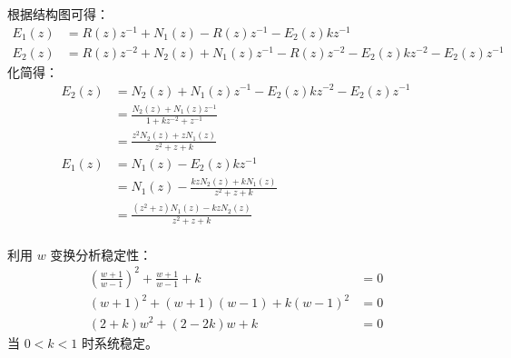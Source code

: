 {{	根据结构图可得：
	\begin{align*}
		E_1(z) &=R(z)z^{-1}+N_1(z) -R(z)z^{-1}-E_2(z)kz^{-1} \\
		E_2(z )&=R(z)z^{-2}+N_2(z)+N_1(z)z^{-1} -R(z)z^{-2}-E_2(z)kz^{-2}-E_2(z)z^{-1} 
	\end{align*}
	化简得：
	\begin{align*}
	E_2(z )&=N_2(z)+N_1(z)z^{-1}-E_2(z)kz^{-2}-E_2(z)z^{-1}\\
	       &=\frac{N_2(z)+N_1(z)z^{-1}}{1+kz^{-2}+z^{-1}}\\
	       &=\frac{z^2 N_2(z)+z N_1(z)}{z^2+z+k}\\
	E_1(z) &=N_1(z)-E_2(z)kz^{-1} \\
	       &=N_1(z)-\frac{kz N_2(z)+k N_1(z)}{z^2+z+k}\\
	       &=\frac{(z^2+z)N_1(z)-kz N_2(z)}{z^2+z+k}\\
	\end{align*}
	
	利用 $w$ 变换分析稳定性：
		\begin{align*}
		\left(\frac{w+1}{w-1}\right)^2+\frac{w+1}{w-1}+k &=0 \\
		(w+1)^2+(w+1)(w-1)+k(w-1)^2 &=0   \\
		(2+k)w^2+(2-2k)w+k &=0
		\end{align*}
		当 $0<k<1$ 时系统稳定。
		
	
}

}





